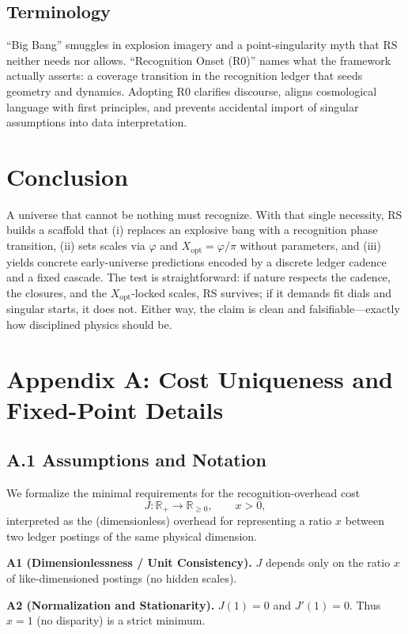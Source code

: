 \documentclass[11pt]{article}
\theoremstyle{definition}
\theoremstyle{remark}
\begin{document}
\subsection{Terminology}
“Big Bang” smuggles in explosion imagery and a point-singularity myth that RS neither needs nor allows. “Recognition Onset (R0)” names what the framework actually asserts: a coverage transition in the recognition ledger that seeds geometry and dynamics. Adopting R0 clarifies discourse, aligns cosmological language with first principles, and prevents accidental import of singular assumptions into data interpretation.

\section{Conclusion}
A universe that cannot be nothing must recognize. With that single necessity, RS builds a scaffold that (i) replaces an explosive bang with a recognition phase transition, (ii) sets scales via \(\varphi\) and \(X_{\mathrm{opt}}=\varphi/\pi\) without parameters, and (iii) yields concrete early-universe predictions encoded by a discrete ledger cadence and a fixed cascade. The test is straightforward: if nature respects the cadence, the closures, and the \(X_{\mathrm{opt}}\)-locked scales, RS survives; if it demands fit dials and singular starts, it does not. Either way, the claim is clean and falsifiable—exactly how disciplined physics should be.

\appendix

\section*{Appendix A: Cost Uniqueness and Fixed-Point Details}

\subsection*{A.1 Assumptions and Notation}
We formalize the minimal requirements for the recognition-overhead cost
\[
J:\mathbb{R}_+\to\mathbb{R}_{\ge 0},\qquad x>0,
\]
interpreted as the (dimensionless) overhead for representing a ratio $x$ between two ledger postings of the same physical dimension.

\medskip
\noindent\textbf{A1 (Dimensionlessness / Unit Consistency).}
$J$ depends only on the ratio $x$ of like-dimensioned postings (no hidden scales).

\noindent\textbf{A2 (Normalization and Stationarity).}
$J(1)=0$ and $J'(1)=0$. Thus $x=1$ (no disparity) is a strict minimum.
\end{document}

